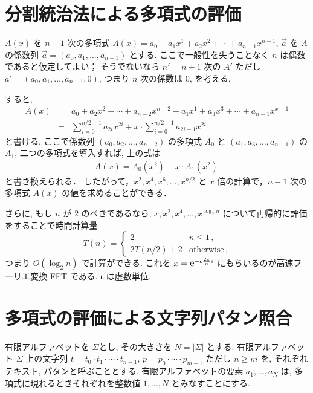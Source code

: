\documentclass[11pt]{jarticle}
\newcommand{\napier}{%
\mathnormal{\mbox{\large{$\mathrm{e}$}}}    %
}
\begin{document}
\section{分割統治法による多項式の評価}

$A(x)$ を $n-1$ 次の多項式 $A(x) = a_0 + a_1 x^1 + a_2 x^2 + \cdots + a_{n-1} x^{n-1}$,  
$\vec{a}$ を $A$ の係数列 $\vec{a} = (a_0, a_1, \ldots, a_{n-1})$ とする. 
ここで一般性を失うことなく $n$ は偶数であると仮定してよい； 
そうでないなら $n' = n + 1$ 次の  $A'$ ただし $a' = (a_0, a_1, \ldots, a_{n-1}, 0)$, つまり $n$ 次の係数は 0, を考える. 

すると, 
\begin{eqnarray*}
A(x) &=& a_0 + a_2 x^2 + \cdots + a_{n-2} x^{n-2}
+ a_1 x^1 + a_3 x^3 + \cdots +a_{n-1} x^{x-1} \\
&=& \sum_{i=0}^{n/2 - 1} a_{2i} x^{2i} + x \cdot\sum_{i=0}^{n/2 - 1} a_{2i+1} x^{2i} \,
\end{eqnarray*}
と書ける. 
ここで係数列 $(a_0, a_2, \ldots, a_{n-2})$ の多項式 $A_0$ と $(a_1, a_3, \ldots, a_{n-1})$ の $A_1$, 二つの多項式を導入すれば, 上の式は 
\begin{eqnarray*}
A(x) = A_0(x^2) + x \cdot A_1(x^2) \,
\end{eqnarray*}
と書き換えられる．
したがって，$x^2, x^4, x^6, \ldots, x^{n/2}$ と $x$ 倍の計算で，$n-1$ 次の多項式 $A(x)$ の値を求めることができる．

さらに, もし $n$ が 2 のべきであるなら, $x, x^2, x^4, \ldots, x^{\log_2{n}}$ について再帰的に評価をすることで時間計算量
\[
T(n) =
\left\{\begin{array}{ll}
2 & n \leq 1 \,,\\
2T(n/2) + 2 & \mbox{otherwise}\,,
\end{array}\right.
\]
つまり $O(\log_2{n})$ で計算ができる. 
これを
 $x = \napier^{-\boldsymbol\iota\frac{2\pi}{n}i}$ にもちいるのが高速フーリエ変換 FFT である. 
$\boldsymbol\iota$ は虚数単位. 
 
 
\section{多項式の評価による文字列パタン照合}

有限アルファベットを $\Sigma$とし, その大きさを $N=|\Sigma|$ とする. 
有限アルファベット $\Sigma$ 上の文字列 $t = t_0 \cdot t_1 \cdot \cdots\cdot t_{n-1}$, $p = p_0 \cdot \cdots \cdot p_{m-1}$ ただし $n \geq m$ を, それぞれテキスト, パタンと呼ぶこととする. 
有限アルファベットの要素 $a_1, \ldots, a_{N}$ は, 多項式に現れるときそれぞれを整数値 $1, \ldots, N$ とみなすことにする. 
\end{document}
